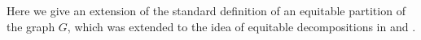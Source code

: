 \documentclass[preprint,12pt]{elsarticle}
\newcommand{\cT}{\mathcal{T}}
\newtheorem{thm}{Theorem}[section]
\theoremstyle{definition}
\newtheorem{defn}[thm]{Definition}
\theoremstyle{remark}
\renewcommand{\emph}{\textit}
\begin{document}
%
%
%

Here we give an extension of the standard definition of an equitable partition of the graph $G$, which was extended to the idea of equitable decompositions in \cite{BFW} and \cite{FSSW}.
\end{document}
